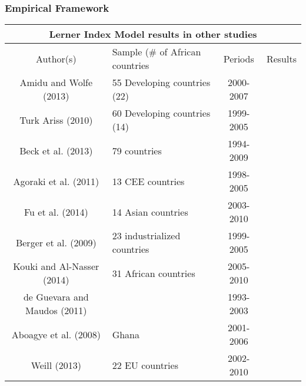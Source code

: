 \documentclass[11pt]{beamer}
\begin{document}
\begin{frame}
\frametitle{Empirical Framework}
\centering
\tiny
\begin{tabular}{clcl}
\toprule
\multicolumn{4}{c}{Lerner Index Model results in other studies}\\
\midrule
Author(s)   &   Sample (\# of African countries &   Periods &   Results \\
\midrule
Amidu and Wolfe (2013)  &   55 Developing countries (22)    &   2000-2007   &       \\
Turk Ariss (2010)   &   60 Developing countries (14)    &   1999-2005   &       \\
Beck et al. (2013)  &   79 countries    &   1994-2009   &       \\
Agoraki et al. (2011)   &   13 CEE countries    &   1998-2005   &       \\
Fu et al. (2014)    &   14 Asian countries  &   2003-2010   &       \\
Berger et al. (2009)    &   23 industrialized countries     &   1999-2005   &       \\
Kouki and Al-Nasser (2014)  &   31 African countries    &   2005-2010   &       \\
de Guevara and Maudos (2011)    &       &   1993-2003   &       \\
Aboagye et al. (2008)   &   Ghana   &   2001-2006   &       \\
Weill (2013)    &   22 EU countries &   2002-2010   &       \\
\bottomrule
\end{tabular}
\end{frame}
\end{document}
